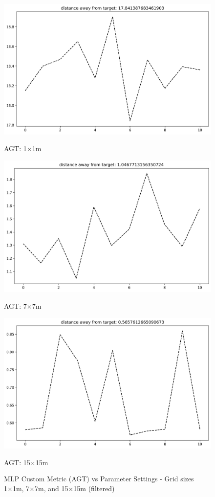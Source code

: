 \documentclass[runningheads]{llncs}
\begin{document}
\begin{figure}[H]
	\centering
	\begin{minipage}{0.32\textwidth}
		\centering
		\includegraphics[width=\textwidth]{figures/mlp_custom_1.png}
		\caption*{AGT: 1×1m}
	\end{minipage}
	\hfill
	\begin{minipage}{0.32\textwidth}
		\centering
		\includegraphics[width=\textwidth]{figures/mlp_custom_7.png}
		\caption*{AGT: 7×7m}
	\end{minipage}
	\hfill
	\begin{minipage}{0.32\textwidth}
		\centering
		\includegraphics[width=\textwidth]{figures/mlp_custom_15.png}
		\caption*{AGT: 15×15m}
	\end{minipage}
	\caption{MLP Custom Metric (AGT) vs Parameter Settings - Grid sizes 1×1m, 7×7m, and 15×15m (filtered)}
\end{figure}
\end{document}
